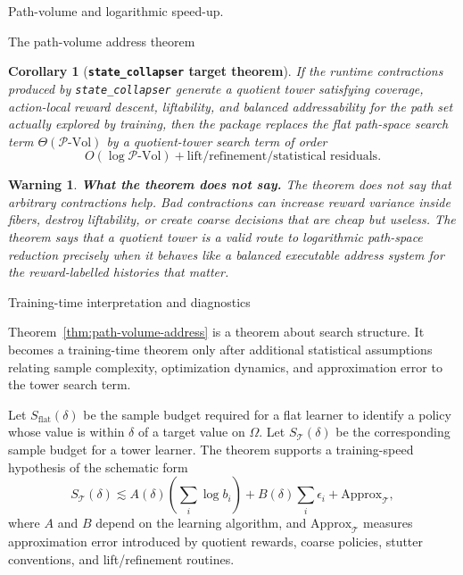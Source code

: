 \documentclass[11pt]{article}
\newtheorem{warning}[subsubsection]{Warning}
\newtheorem{corollary}[subsubsection]{Corollary}
\newcommand{\PVol}{\mathcal{P}\text{-}\mathrm{Vol}}
\begin{document}
\begin{section}{Path-volume and logarithmic speed-up.}
\begin{subsection}{The path-volume address theorem}
\begin{corollary}[{\bf \texttt{state\_collapser} target theorem}]\label{cor:state-collapser-path-volume}
If the runtime contractions produced by \texttt{state\_collapser} generate a quotient tower satisfying coverage, action-local reward descent, liftability, and balanced addressability for the path set actually explored by training, then the package replaces the flat path-space search term
$
\Theta(\PVol)
$
by a quotient-tower search term of order
$$
O(\log \PVol)
+
\text{lift/refinement/statistical residuals}.
$$
\end{corollary}

\begin{warning}
{\bf What the theorem does not say.}
\normalfont
The theorem does not say that arbitrary contractions help. Bad contractions can increase reward variance inside fibers, destroy liftability, or create coarse decisions that are cheap but useless. The theorem says that a quotient tower is a valid route to logarithmic path-space reduction precisely when it behaves like a balanced executable address system for the reward-labelled histories that matter.
\end{warning}

\end{subsection}

\begin{subsection}{Training-time interpretation and diagnostics}

Theorem~\ref{thm:path-volume-address} is a theorem about search structure. It becomes a training-time theorem only after additional statistical assumptions relating sample complexity, optimization dynamics, and approximation error to the tower search term.

Let $S_{\mathrm{flat}}(\delta)$ be the sample budget required for a flat learner to identify a policy whose value is within $\delta$ of a target value on $\Omega$. Let $S_{\mathcal T}(\delta)$ be the corresponding sample budget for a tower learner. The theorem supports a training-speed hypothesis of the schematic form
$$
S_{\mathcal T}(\delta)
\lesssim
A(\delta)\left(\sum_i\log b_i\right)
+
B(\delta)\sum_i\epsilon_i
+
\mathrm{Approx}_{\mathcal T},
$$
where $A$ and $B$ depend on the learning algorithm, and $\mathrm{Approx}_{\mathcal T}$ measures approximation error introduced by quotient rewards, coarse policies, stutter conventions, and lift/refinement routines.


\end{subsection}
\end{section}
\end{document}
